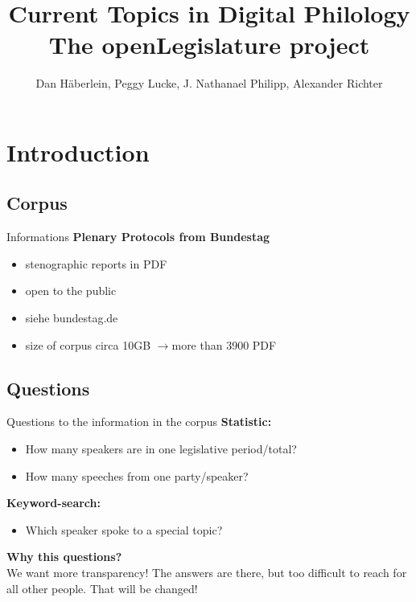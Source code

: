 \documentclass[11pt, a4paper]{beamer}
\author{Dan Häberlein, Peggy Lucke, J. Nathanael Philipp, Alexander Richter}
\title[The openLegislature project]{Current Topics in Digital Philology\\The openLegislature project}
\date{}
\institute{Universität Leipzig}
\begin{document}
\section{}
\begin{frame}
\titlepage
\end{frame}

 {
}


\section{Introduction}
\subsection{Corpus}
\begin{frame}{Informations}
\textbf{Plenary Protocols from Bundestag}
\begin{itemize}
\item stenographic reports in PDF
\item open to the public
\item siehe bundestag.de \cite{bundestag} \\[1em]
\item size of corpus circa 10GB $\rightarrow$more than 3900 PDF 
\end{itemize}
\end{frame}

\subsection{Questions}
\begin{frame}{Questions to the information in the corpus}
\textbf{Statistic:}
\begin{itemize}
\item How many speakers are in one legislative period/total?
\item How many speeches from one party/speaker?
\end{itemize}
\textbf{Keyword-search:}
\begin{itemize}
\item Which speaker spoke to a special topic?
\end{itemize}
\textbf{Why this questions?}\\
We want more transparency! The answers are there, but too difficult to reach for all other people. That will be changed!
\end{frame}
\end{document}
